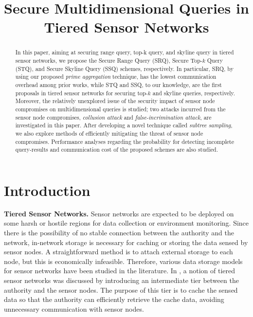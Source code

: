 \documentclass[conference]{IEEEtran}
\begin{document}
\title{Secure Multidimensional Queries in Tiered Sensor Networks}

\author{

}

\maketitle


\begin{abstract}
In this paper, aiming at securing range query, top-k query, and skyline query in tiered sensor networks, we propose the Secure Range Query (SRQ), Secure Top-$k$ Query (STQ), and Secure Skyline Query (SSQ) schemes, respectively. In particular, SRQ, by using our proposed \emph{prime aggregation} technique, has the lowest communication overhead among prior works, while STQ and SSQ, to our knowledge, are the first proposals in tiered sensor networks for securing top-$k$ and skyline queries, respectively. Moreover, the relatively unexplored issue of the security impact of sensor node compromises on multidimensional queries is studied; two attacks incurred from the sensor node compromises, \emph{collusion attack} and \emph{false-incrimination attack}, are investigated in this paper. After developing a novel technique called \emph{subtree sampling}, we also explore methods of efficiently mitigating the threat of sensor node compromises. Performance analyses regarding the probability for detecting incomplete query-results and communication cost of the proposed schemes are also studied.
\end{abstract}

\section{Introduction}\label{sec: Introduction}

\textbf{Tiered Sensor Networks.} Sensor networks are expected to be deployed on some harsh or hostile regions for data collection or environment monitoring. Since there is the possibility of no stable connection between the authority and the network, in-network storage is necessary for caching or storing the data sensed by sensor nodes. A straightforward method is to attach external storage to each node, but this is economically infeasible. Therefore, various data storage models for sensor networks have been studied in the literature. In \cite{rksegyy03,dglls05}, a notion of tiered sensor networks was discussed by introducing an intermediate tier between the authority and the sensor nodes. The purpose of this tier is to cache the sensed data so that the authority can efficiently retrieve the cache data, avoiding unnecessary communication with sensor nodes.
\end{document}
